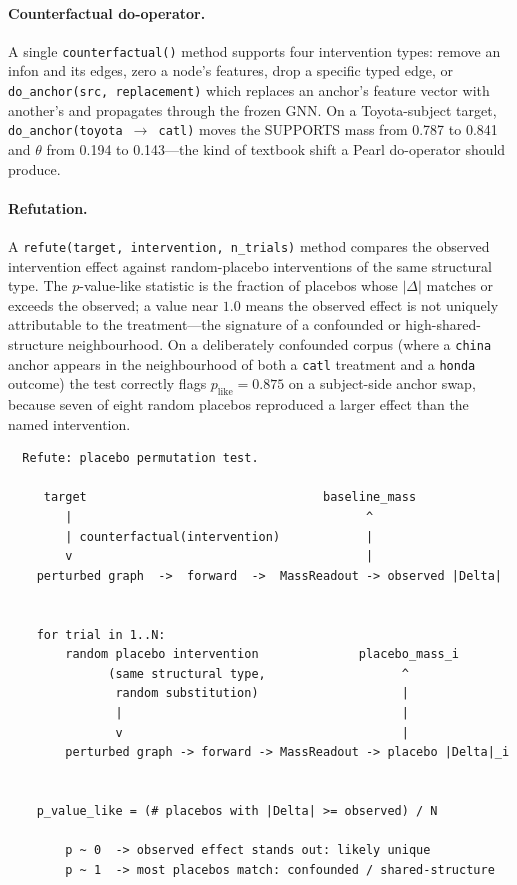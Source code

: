\documentclass[11pt,a4paper]{article}
\begin{document}
\paragraph{Counterfactual do-operator.} A single
\texttt{counterfactual()} method supports four intervention
types: remove an infon and its edges, zero a node's features,
drop a specific typed edge, or \texttt{do\_anchor(src,
replacement)} which replaces an anchor's feature vector with
another's and propagates through the frozen GNN. On a
Toyota-subject target, \texttt{do\_anchor(toyota $\to$ catl)}
moves the SUPPORTS mass from 0.787 to 0.841 and $\theta$ from
0.194 to 0.143---the kind of textbook shift a Pearl do-operator
should produce.

\paragraph{Refutation.} A \texttt{refute(target, intervention,
n\_trials)} method compares the observed intervention effect
against random-placebo interventions of the same structural
type. The $p$-value-like statistic is the fraction of placebos
whose $|\Delta|$ matches or exceeds the observed; a value near
$1.0$ means the observed effect is not uniquely attributable to
the treatment---the signature of a confounded or
high-shared-structure neighbourhood. On a deliberately confounded
corpus (where a \texttt{china} anchor appears in the
neighbourhood of both a \texttt{catl} treatment and a
\texttt{honda} outcome) the test correctly flags $p_{\text{like}}
= 0.875$ on a subject-side anchor swap, because seven of eight
random placebos reproduced a larger effect than the named
intervention.

\begin{verbatim}
  Refute: placebo permutation test.

     target                                 baseline_mass
        |                                         ^
        | counterfactual(intervention)            |
        v                                         |
    perturbed graph  ->  forward  ->  MassReadout -> observed |Delta|


    for trial in 1..N:
        random placebo intervention              placebo_mass_i
              (same structural type,                   ^
               random substitution)                    |
               |                                       |
               v                                       |
        perturbed graph -> forward -> MassReadout -> placebo |Delta|_i


    p_value_like = (# placebos with |Delta| >= observed) / N

        p ~ 0  -> observed effect stands out: likely unique
        p ~ 1  -> most placebos match: confounded / shared-structure
\end{verbatim}
\end{document}
